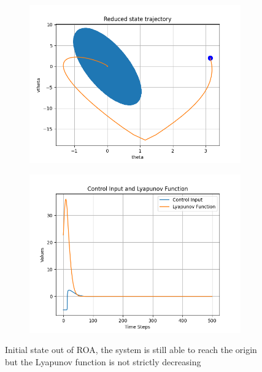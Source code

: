 \documentclass{article}
\begin{document}
\begin{figure}[H]
    \centering
    \begin{subfigure}{0.48\textwidth}
    \includegraphics[width=\textwidth]{img/red_state_out}
    \end{subfigure}
    \hfill
    \begin{subfigure}{0.48\textwidth}
    \includegraphics[width=\textwidth]{img/lyap_out}
    \end{subfigure}
    \caption{Initial state out of ROA, the system is still able to reach the origin but the Lyapunov function is not strictly decreasing}
\end{figure}
\end{document}
